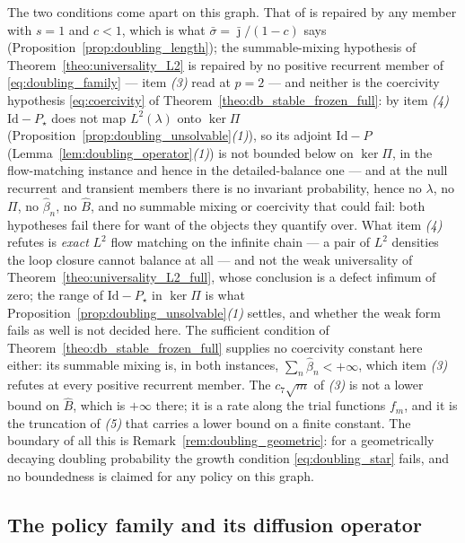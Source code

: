 The two conditions come apart on this graph. That of \citet{morozov2025revisiting} is repaired
by any member with $s=1$ and $c<1$, which is what $\bar\sigma=\bar\jmath/(1-c)$ says
(Proposition~\ref{prop:doubling_length}); the summable-mixing hypothesis of
Theorem~\ref{theo:universality_L2} is repaired by no positive recurrent member of
\eqref{eq:doubling_family} --- item \emph{(3)} read at $p=2$ --- and neither is the
coercivity hypothesis \eqref{eq:coercivity} of Theorem~\ref{theo:db_stable_frozen_full}: by
item \emph{(4)} $\mathrm{Id}-P_\star$ does not map $L^2(\lambda)$ onto $\ker\Pi$
(Proposition~\ref{prop:doubling_unsolvable}\emph{(1)}), so its adjoint $\mathrm{Id}-P$
(Lemma~\ref{lem:doubling_operator}\emph{(1)}) is not bounded below on $\ker\Pi$, in the
flow-matching instance and hence in the detailed-balance one --- and at the null
recurrent and transient members there is no invariant probability, hence no $\lambda$, no
$\Pi$, no $\widehat\beta_n$, no $\widehat B$, and no summable mixing or coercivity that could
fail: both hypotheses fail there for want of the objects they quantify over. What item \emph{(4)}
refutes is \emph{exact} $L^2$ flow matching on the infinite chain --- a pair of $L^2$
densities the loop closure cannot balance at all --- and not the weak universality of
Theorem~\ref{theo:universality_L2_full}, whose conclusion is a defect infimum of zero; the
range of $\mathrm{Id}-P_\star$ in $\ker\Pi$ is what
Proposition~\ref{prop:doubling_unsolvable}\emph{(1)} settles, and whether the weak form fails
as well is not decided here. The sufficient condition of
Theorem~\ref{theo:db_stable_frozen_full} supplies no coercivity constant here either: its
summable mixing is, in both instances, $\sum_n\widehat\beta_n<+\infty$, which item \emph{(3)}
refutes at every positive recurrent member. The $c_7\sqrt m$ of \emph{(3)} is not a lower bound on
$\widehat B$, which is $+\infty$ there; it is a
rate along the trial functions $f_m$, and it is the truncation of \emph{(5)} that carries a
lower bound on a finite constant. The boundary of all this is
Remark~\ref{rem:doubling_geometric}: for a geometrically decaying doubling probability the
growth condition \eqref{eq:doubling_star} fails, and no boundedness is claimed for any policy on
this graph.

\subsection{The policy family and its diffusion operator}\label{sec:doubling_family}

